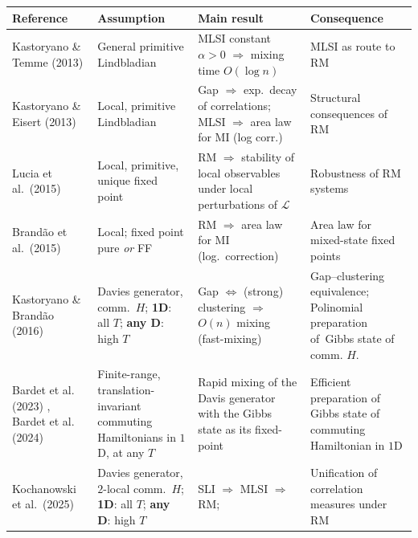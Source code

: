 \documentclass[11pt]{article}
\numberwithin{equation}{section}
\numberwithin{figure}{section}
\numberwithin{table}{section}
\theoremstyle{definition}
\theoremstyle{plain}
\theoremstyle{remark}
\begin{document}
 
\begin{table}[h!]
\centering
\small
\renewcommand{\arraystretch}{1.25}
\setlength{\tabcolsep}{4pt}
\begin{tabular}{@{}|p{2.8cm}|p{3.8cm}|p{4.0cm}|p{2.2cm}|@{}}
\toprule
\textbf{Reference} & \textbf{Assumption} & \textbf{Main result} & \textbf{Consequence} \\
\midrule

Kastoryano \& Temme (2013) \cite{kastoryano_quantum_2013}
  & General primitive Lindbladian
  & MLSI constant $\alpha>0$
    $\Rightarrow$ mixing time $O(\log n)$
  & MLSI as route to RM \\
\hline

Kastoryano \& Eisert (2013) \cite{kastoryano_rapid_2013}
  & Local, primitive Lindbladian
  & Gap $\Rightarrow$ exp.\ decay of correlations;
    MLSI $\Rightarrow$ area law for MI (log corr.)
  & Structural consequences of RM \\
\hline

Lucia et al.\ (2015) \cite{lucia_rapid_2015}
  & Local, primitive, unique fixed point
  & RM $\Rightarrow$ stability of local observables
    under local perturbations of $\mathcal{L}$
  & Robustness of RM systems \\
\hline

Brand\~ao et al.\ (2015) \cite{brandao_area_2015}
  & Local; fixed point pure \emph{or} FF
  & RM $\Rightarrow$ area law for MI
    (log.\ correction)
  & Area law for mixed-state fixed points \\
\hline

Kastoryano \& Brand\~ao (2016) \cite{kastoryano_gibbs_2016}
  & Davies generator, comm.\ $H$;
    \textbf{1D}: all $T$;
    \textbf{any D}: high $T$
  & Gap $\Leftrightarrow$ (strong) clustering
    $\Rightarrow$ $O( n)$ mixing (fast-mixing)
  & Gap--clustering equivalence;
   Polinomial preparation of\ Gibbs state of comm. $H$. \\

\hline

 Bardet et al. (2023) \cite{Bardet_2023}, Bardet et al. (2024) \cite{Bardet_2024}
& Finite-range, translation-invariant commuting Hamiltonians in $1$D, at any $T$
&
Rapid mixing of the Davis generator with the Gibbs state as its fixed-point
&
Efficient preparation of Gibbs state of commuting Hamiltonian in $1$D
\\
\hline

Kochanowski et al.\ (2025) \cite{kochanowski_rapid_2025}
  & Davies generator, $2$-local comm.\ $H$;
    \textbf{1D}: all $T$;
    \textbf{any D}: high $T$
  & SLI
    $\Rightarrow$ MLSI $\Rightarrow$ RM;
  & Unification of correlation measures
    under RM \\


\end{tabular}
\end{table}
\end{document}
